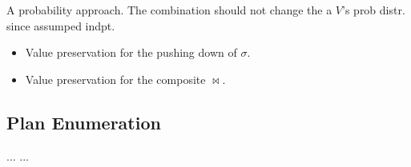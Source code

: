 \documentclass[a4paper]{report}
\begin{document}
A probability approach. The combination should not change the a $V$'s prob distr. since assumped indpt.
\begin{itemize}
\item Value preservation for the pushing down of $\sigma$. 
\item Value preservation for the composite $\bowtie$. 
\end{itemize}
\subsection{Plan Enumeration}

\begin{thebibliography}{99}
 ...
 ...
\end{thebibliography}
\end{document}
